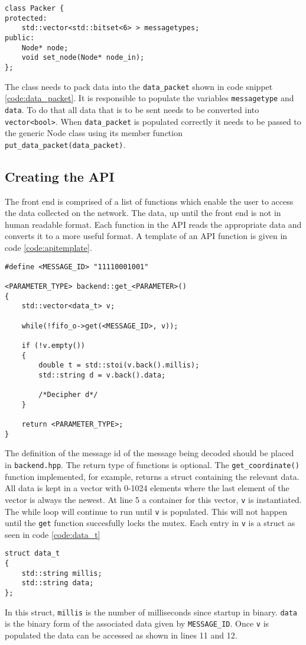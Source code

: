 \begin{lstlisting}[caption=Packer class.,label=code:packer]
class Packer {
protected: 
	std::vector<std::bitset<6> > messagetypes;
public:
	Node* node;
	void set_node(Node* node_in);
};
\end{lstlisting}

The class needs to pack data into the \texttt{data\_packet} shown in code snippet \ref{code:data_packet}.
It is responsible to populate the variables \texttt{messagetype} and \texttt{data}.
To do that all data that is to be sent needs to be converted into \texttt{vector<bool>}.
When \texttt{data\_packet} is populated correctly it needs to be passed to the generic Node class using its member function \texttt{put\_data\_packet(data\_packet)}.

\subsection{Creating the API}
The front end is comprised of a list of functions which enable the user to access the data collected on the network.
The data, up until the front end is not in human readable format.
Each function in the API reads the appropriate data and converts it to a more useful format.
A template of an API function is given in code \ref{code:apitemplate}.

\begin{lstlisting}[caption=Function template for accesing data,label=code:apitemplate]
#define <MESSAGE_ID> "11110001001"

<PARAMETER_TYPE> backend::get_<PARAMETER>()
{
	std::vector<data_t> v;

	while(!fifo_o->get(<MESSAGE_ID>, v));

	if (!v.empty())
	{
		double t = std::stoi(v.back().millis);
		std::string d = v.back().data;

		/*Decipher d*/		
	}

	return <PARAMETER_TYPE>;
}
\end{lstlisting}

The definition of the message id of the message being decoded should be placed in \texttt{backend.hpp}.
The return type of functions is optional.
The \texttt{get\_coordinate()} function implemented, for example, returns a struct containing the relevant data.
All data is kept in a vector with 0-1024 elements where the last element of the vector is always the newest.
At line 5 a container for this vector, \texttt{v} is instantiated.
The while loop will continue to run until \texttt{v} is populated.
This will not happen until the \texttt{get} function succesfully locks the mutex.
Each entry in \texttt{v} is a struct as seen in code \ref{code:data_t}

\begin{lstlisting}[caption=Struct used to store each datapoint,label=code:data_t]
struct data_t
{
	std::string millis;
	std::string data;
};
\end{lstlisting}

In this struct, \texttt{millis} is the number of milliseconds since startup in binary.
\texttt{data} is the binary form of the associated data given by \texttt{MESSAGE\_ID}.
Once \texttt{v} is populated the data can be accessed as shown in lines 11 and 12.